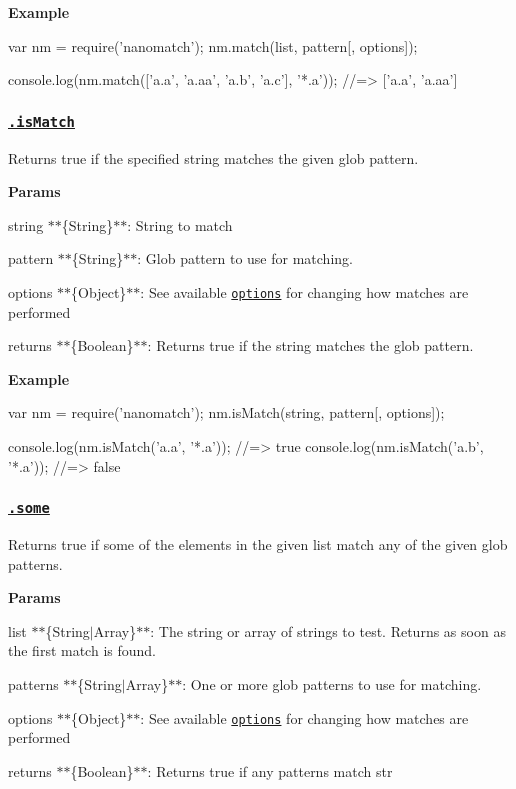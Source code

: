 {\bfseries Example}


\begin{DoxyCode}
var nm = require('nanomatch');
nm.match(list, pattern[, options]);

console.log(nm.match(['a.a', 'a.aa', 'a.b', 'a.c'], '*.a'));
//=> ['a.a', 'a.aa']
\end{DoxyCode}


\subsubsection*{\href{index.js#L167}{\tt .is\+Match}}

Returns true if the specified {\ttfamily string} matches the given glob {\ttfamily pattern}.

{\bfseries Params}


\begin{DoxyItemize}
\item {\ttfamily string} $\ast$$\ast$\{String\}$\ast$$\ast$\+: String to match
\item {\ttfamily pattern} $\ast$$\ast$\{String\}$\ast$$\ast$\+: Glob pattern to use for matching.
\item {\ttfamily options} $\ast$$\ast$\{Object\}$\ast$$\ast$\+: See available \href{#options}{\tt options} for changing how matches are performed
\item {\ttfamily returns} $\ast$$\ast$\{Boolean\}$\ast$$\ast$\+: Returns true if the string matches the glob pattern.
\end{DoxyItemize}

{\bfseries Example}


\begin{DoxyCode}
var nm = require('nanomatch');
nm.isMatch(string, pattern[, options]);

console.log(nm.isMatch('a.a', '*.a'));
//=> true
console.log(nm.isMatch('a.b', '*.a'));
//=> false
\end{DoxyCode}


\subsubsection*{\href{index.js#L205}{\tt .some}}

Returns true if some of the elements in the given {\ttfamily list} match any of the given glob {\ttfamily patterns}.

{\bfseries Params}


\begin{DoxyItemize}
\item {\ttfamily list} $\ast$$\ast$\{String$\vert$\+Array\}$\ast$$\ast$\+: The string or array of strings to test. Returns as soon as the first match is found.
\item {\ttfamily patterns} $\ast$$\ast$\{String$\vert$\+Array\}$\ast$$\ast$\+: One or more glob patterns to use for matching.
\item {\ttfamily options} $\ast$$\ast$\{Object\}$\ast$$\ast$\+: See available \href{#options}{\tt options} for changing how matches are performed
\item {\ttfamily returns} $\ast$$\ast$\{Boolean\}$\ast$$\ast$\+: Returns true if any patterns match {\ttfamily str}
\end{DoxyItemize}


